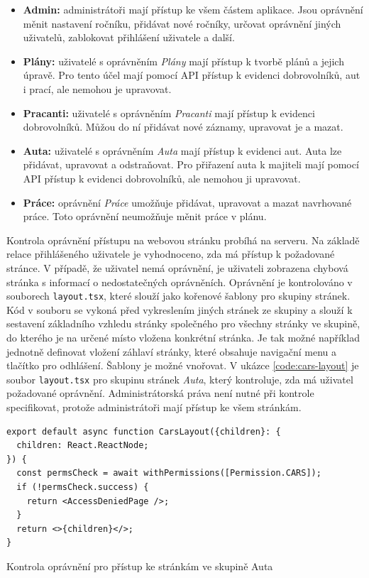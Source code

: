\begin{itemize}
    \item \textbf{Admin:} administrátoři mají přístup ke všem částem aplikace. Jsou oprávnění měnit nastavení ročníku, přidávat nové ročníky, určovat oprávnění jiných uživatelů, zablokovat přihlášení uživatele a další.
    \item \textbf{Plány:} uživatelé s oprávněním \textit{Plány} mají přístup k tvorbě plánů a jejich úpravě. Pro tento účel mají pomocí API přístup k evidenci dobrovolníků, aut i prací, ale nemohou je upravovat.
    \item \textbf{Pracanti:} uživatelé s oprávněním \textit{Pracanti} mají přístup k evidenci dobrovolníků. Můžou do ní přidávat nové záznamy, upravovat je a mazat.
    \item \textbf{Auta:} uživatelé s oprávněním \textit{Auta} mají přístup k evidenci aut. Auta lze přidávat, upravovat a odstraňovat. Pro přiřazení auta k majiteli mají pomocí API přístup k evidenci dobrovolníků, ale nemohou ji upravovat.
    \item \textbf{Práce:} oprávnění \textit{Práce} umožňuje přidávat, upravovat a mazat navrhované práce. Toto oprávnění neumožňuje měnit práce v plánu.
\end{itemize}

Kontrola oprávnění přístupu na webovou stránku probíhá na serveru. Na základě relace přihlášeného uživatele je vyhodnoceno, zda má přístup k požadované stránce.
V případě, že uživatel nemá oprávnění, je uživateli zobrazena chybová stránka s informací o nedostatečných oprávněních.
Oprávnění je kontrolováno v souborech \texttt{layout.tsx}, které slouží jako kořenové šablony pro skupiny stránek. Kód v souboru se vykoná před vykreslením
jiných stránek ze skupiny a slouží k sestavení základního vzhledu stránky společného pro všechny stránky ve skupině, do kterého je na určené místo vložena konkrétní stránka.
Je tak možné například jednotně definovat vložení záhlaví stránky, které obsahuje navigační menu a tlačítko pro odhlášení. Šablony je možné vnořovat.
V ukázce \ref{code:cars-layout} je soubor \texttt{layout.tsx} pro skupinu stránek \textit{Auta}, který kontroluje, zda má uživatel požadované oprávnění.
Administrátorská práva není nutné při kontrole specifikovat, protože administrátoři mají přístup ke všem stránkám.

\begin{listing}[h]
  \begin{verbatim}
export default async function CarsLayout({children}: {
  children: React.ReactNode;
}) {
  const permsCheck = await withPermissions([Permission.CARS]);
  if (!permsCheck.success) {
    return <AccessDeniedPage />;
  }
  return <>{children}</>;
}
    \end{verbatim}
    \caption{Kontrola oprávnění pro přístup ke stránkám ve skupině Auta}
    \label{code:cars-layout}
\end{listing}

